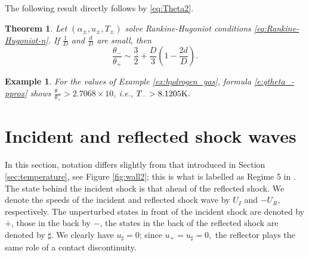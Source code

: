 \documentclass[10pt,a4paper]{article}
\newtheorem{theorem}{Theorem}[section]
\newtheorem{example}{Example}[section]
\numberwithin{equation}{section}
\begin{document}
\par
The following result directly follows by \eqref{eq:Theta2}.
\begin{theorem}\label{thm:temperature}
Let $(\alpha_\pm,u_\pm,T_\pm)$ solve Rankine-Hugoniot conditions \eqref{eq:Rankine-Hugoniot-n}. If $\frac1D$ and $\frac{d}{D}$ are small, then
\begin{equation}\label{e:qtheta_-pprox}
    \frac{\theta_-}{\theta_+} \sim \frac{3}{2} + \frac{D}{3}\left(1 - \frac{2d}{D}\right).
\end{equation}
\end{theorem}
%
\begin{example}\label{nb:temperature}
For the values of Example \ref{ex:hydrogen_gas}, formula \eqref{e:qtheta_-pprox} shows $ \frac{\theta_-}{\theta_+} > 2.7068
 \times 10$, %
i.e., $T_{-} > 8.1205 {\rm K}.$
\end{example} 


\section{Incident and reflected shock waves}\label{sec:condition Lax}

In this section, notation differs slightly from that introduced in Section \ref{sec:temperature}, see Figure \ref{fig:wall2}; this is what is labelled as Regime 5 in \cite{Fukuda-Okasaka-Fujimoto}.
The state behind the incident shock is that ahead of the reflected shock. We denote the speeds of the incident and reflected shock wave by $U_I$ and $-U_R$, respectively. The unperturbed states in front of the incident shock are denoted by $+$, those in the back by $-$, the states in the back of the reflected shock are denoted by $\sharp$. We clearly have $u_{\sharp} = 0$; since $u_+ = u_{\sharp} = 0,$ the reflector plays the same role of a  contact discontinuity.

\end{document}
